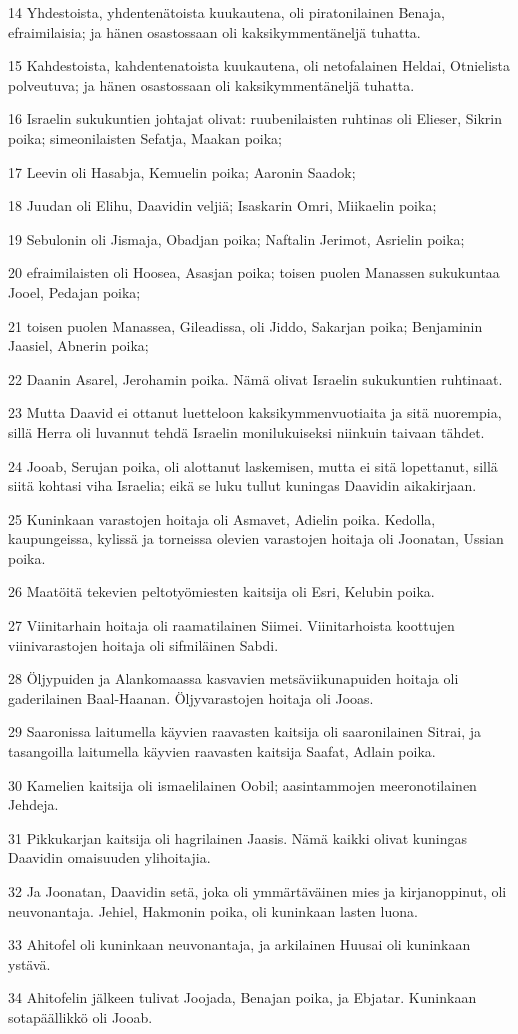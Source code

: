 \par 14 Yhdestoista, yhdentenätoista kuukautena, oli piratonilainen Benaja, efraimilaisia; ja hänen osastossaan oli kaksikymmentäneljä tuhatta.
\par 15 Kahdestoista, kahdentenatoista kuukautena, oli netofalainen Heldai, Otnielista polveutuva; ja hänen osastossaan oli kaksikymmentäneljä tuhatta.
\par 16 Israelin sukukuntien johtajat olivat: ruubenilaisten ruhtinas oli Elieser, Sikrin poika; simeonilaisten Sefatja, Maakan poika;
\par 17 Leevin oli Hasabja, Kemuelin poika; Aaronin Saadok;
\par 18 Juudan oli Elihu, Daavidin veljiä; Isaskarin Omri, Miikaelin poika;
\par 19 Sebulonin oli Jismaja, Obadjan poika; Naftalin Jerimot, Asrielin poika;
\par 20 efraimilaisten oli Hoosea, Asasjan poika; toisen puolen Manassen sukukuntaa Jooel, Pedajan poika;
\par 21 toisen puolen Manassea, Gileadissa, oli Jiddo, Sakarjan poika; Benjaminin Jaasiel, Abnerin poika;
\par 22 Daanin Asarel, Jerohamin poika. Nämä olivat Israelin sukukuntien ruhtinaat.
\par 23 Mutta Daavid ei ottanut luetteloon kaksikymmenvuotiaita ja sitä nuorempia, sillä Herra oli luvannut tehdä Israelin monilukuiseksi niinkuin taivaan tähdet.
\par 24 Jooab, Serujan poika, oli alottanut laskemisen, mutta ei sitä lopettanut, sillä siitä kohtasi viha Israelia; eikä se luku tullut kuningas Daavidin aikakirjaan.
\par 25 Kuninkaan varastojen hoitaja oli Asmavet, Adielin poika. Kedolla, kaupungeissa, kylissä ja torneissa olevien varastojen hoitaja oli Joonatan, Ussian poika.
\par 26 Maatöitä tekevien peltotyömiesten kaitsija oli Esri, Kelubin poika.
\par 27 Viinitarhain hoitaja oli raamatilainen Siimei. Viinitarhoista koottujen viinivarastojen hoitaja oli sifmiläinen Sabdi.
\par 28 Öljypuiden ja Alankomaassa kasvavien metsäviikunapuiden hoitaja oli gaderilainen Baal-Haanan. Öljyvarastojen hoitaja oli Jooas.
\par 29 Saaronissa laitumella käyvien raavasten kaitsija oli saaronilainen Sitrai, ja tasangoilla laitumella käyvien raavasten kaitsija Saafat, Adlain poika.
\par 30 Kamelien kaitsija oli ismaelilainen Oobil; aasintammojen meeronotilainen Jehdeja.
\par 31 Pikkukarjan kaitsija oli hagrilainen Jaasis. Nämä kaikki olivat kuningas Daavidin omaisuuden ylihoitajia.
\par 32 Ja Joonatan, Daavidin setä, joka oli ymmärtäväinen mies ja kirjanoppinut, oli neuvonantaja. Jehiel, Hakmonin poika, oli kuninkaan lasten luona.
\par 33 Ahitofel oli kuninkaan neuvonantaja, ja arkilainen Huusai oli kuninkaan ystävä.
\par 34 Ahitofelin jälkeen tulivat Joojada, Benajan poika, ja Ebjatar. Kuninkaan sotapäällikkö oli Jooab.

